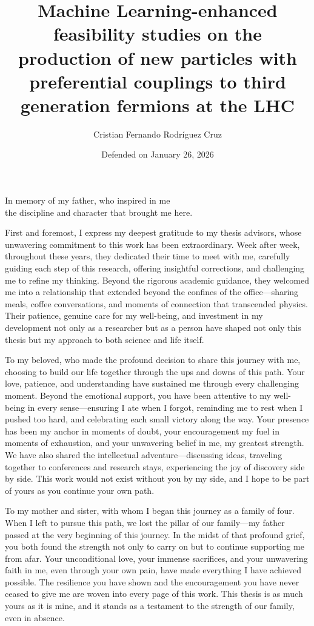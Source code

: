 \documentclass[11pt, letterpaper]{book}%
\title{Machine Learning-enhanced feasibility studies on the production of new particles with preferential couplings to third generation fermions at the LHC}
\author{Cristian Fernando Rodríguez Cruz}
\date{Defended on January 26, 2026}
\begin{document}
\frontmatter

\maketitle

\begin{dedication}
  In memory of my father, who inspired in me\\ 
  the discipline and character that brought me here.
\end{dedication}

\begin{acknowledgements}

First and foremost, I express my deepest gratitude to my thesis advisors, whose unwavering commitment to this work has been extraordinary. Week after week, throughout these years, they dedicated their time to meet with me, carefully guiding each step of this research, offering insightful corrections, and challenging me to refine my thinking. Beyond the rigorous academic guidance, they welcomed me into a relationship that extended beyond the confines of the office—sharing meals, coffee conversations, and moments of connection that transcended physics. Their patience, genuine care for my well-being, and investment in my development not only as a researcher but as a person have shaped not only this thesis but my approach to both science and life itself.

To my beloved, who made the profound decision to share this journey with me, choosing to build our life together through the ups and downs of this path. Your love, patience, and understanding have sustained me through every challenging moment. Beyond the emotional support, you have been attentive to my well-being in every sense—ensuring I ate when I forgot, reminding me to rest when I pushed too hard, and celebrating each small victory along the way. Your presence has been my anchor in moments of doubt, your encouragement my fuel in moments of exhaustion, and your unwavering belief in me, my greatest strength. We have also shared the intellectual adventure—discussing ideas, traveling together to conferences and research stays, experiencing the joy of discovery side by side. This work would not exist without you by my side, and I hope to be part of yours as you continue your own path.

To my mother and sister, with whom I began this journey as a family of four. When I left to pursue this path, we lost the pillar of our family—my father passed at the very beginning of this journey. In the midst of that profound grief, you both found the strength not only to carry on but to continue supporting me from afar. Your unconditional love, your immense sacrifices, and your unwavering faith in me, even through your own pain, have made everything I have achieved possible. The resilience you have shown and the encouragement you have never ceased to give me are woven into every page of this work. This thesis is as much yours as it is mine, and it stands as a testament to the strength of our family, even in absence.


\end{acknowledgements}
\end{document}
